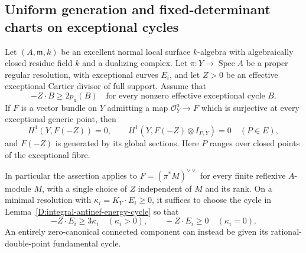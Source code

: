 \subsection{Uniform generation and fixed-determinant charts on exceptional cycles}

\begin{theorem}
\label{D:reflexive-pullback-uniform-generation}
Let $(A,\mathfrak m,k)$ be an excellent normal local surface
$k$-algebra with algebraically closed residue field $k$ and a
dualizing complex. Let $\pi:Y\to\operatorname{Spec}A$ be a proper
regular resolution, with exceptional curves $E_i$, and let $Z>0$
be an effective exceptional Cartier divisor of full support.
Assume that
\[
               -Z\cdot B\ge 2p_a(B)
       \quad\text{for every nonzero effective exceptional cycle }B.
                                                               \tag{D.UG.1}
\]
If $F$ is a vector bundle on $Y$ admitting a map
$\mathcal O_Y^a\to F$ which is surjective at every exceptional
generic point, then
\[
 H^1(Y,F(-Z))=0,\qquad
 H^1(Y,F(-Z)\otimes I_{P,Y})=0\quad(P\in E),             \tag{D.UG.2}
\]
and $F(-Z)$ is generated by its global sections. Here $P$ ranges
over closed points of the exceptional fibre.

In particular the assertion applies to
$F=(\pi^*M)^{\vee\vee}$ for every finite reflexive $A$-module
$M$, with a single choice of $Z$ independent of $M$ and its rank.
On a minimal resolution with
$\kappa_i=K_Y\cdot E_i\ge0$, it suffices to choose the cycle in
Lemma~\ref{D:integral-antinef-energy-cycle} so that
\[
 -Z\cdot E_i\ge3\kappa_i\quad(\kappa_i>0),
 \qquad -Z\cdot E_i\ge0\quad(\kappa_i=0).              \tag{D.UG.3}
\]
An entirely zero-canonical connected component can instead be
given its rational-double-point fundamental cycle.
\end{theorem}

